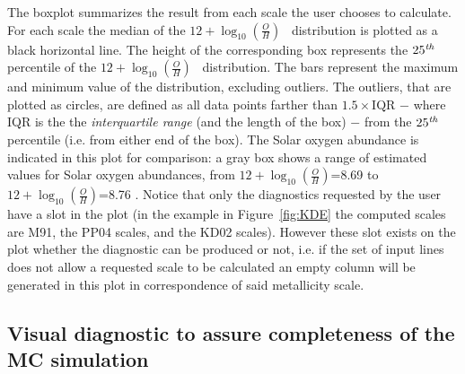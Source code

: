 \documentclass{emulateapj}
\newcommand{\oxab}{\ensuremath{12 + \log_{10}(\frac{O}{H})}}
\begin{document}
The boxplot summarizes the result from each scale the user chooses to calculate. For each scale the median of the \oxab~ distribution is plotted as a black horizontal line. The height of the corresponding box represents the $25^\mathrm{\emph{th}}$ percentile of the \oxab~ distribution. 
The bars represent the maximum and minimum value of the distribution, excluding outliers. The outliers, that are plotted as circles, are defined as all data points farther than  $1.5\times\mathrm{IQR}$ $-$ where IQR is the the \emph{interquartile range} (and the length of the box) $-$ from the $25^\mathrm{\emph{th}}$ percentile (i.e. from either end of the box). 
The Solar oxygen abundance is indicated in this plot for comparison: a gray box shows a range of estimated values for Solar oxygen abundances, from \oxab=8.69 \citep{asplund09_rev} to \oxab=8.76 \citep{chaffau11}.
Notice that only the diagnostics requested by the user have a slot in the plot (in the example in Figure~\ref{fig:KDE} the computed scales are M91, the PP04 scales, and the KD02 scales). However these slot exists on the plot whether the diagnostic can be produced or not, i.e. if the set of input lines does not allow a requested scale to be calculated an empty column will be generated in this plot in correspondence of said metallicity scale.


\subsection{Visual diagnostic to assure completeness of the MC simulation}\label{sec:completeness}
\end{document}

